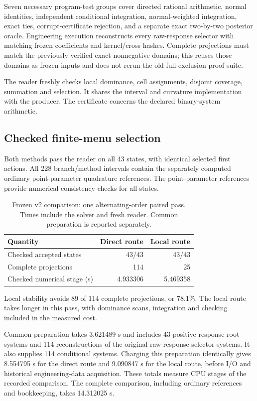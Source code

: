 Seven necessary program-test groups cover directed rational arithmetic, normal identities, independent conditional integration, normal-weighted integration, exact ties, corrupt-certificate rejection, and a separate exact two-by-two posterior oracle. Engineering execution reconstructs every raw-response selector with matching frozen coefficients and kernel/cross hashes. Complete projections must match the previously verified exact nonnegative domains; this reuses those domains as frozen inputs and does not rerun the old full exclusion-proof suite.

The reader freshly checks local dominance, cell assignments, disjoint coverage, summation and selection. It shares the interval and curvature implementation with the producer. The certificate concerns the declared binary-system arithmetic.

\subsection{Checked finite-menu selection}

Both methods pass the reader on all 43 states, with identical selected first actions. All 228 branch/method intervals contain the separately computed ordinary point-parameter quadrature references. The point-parameter references provide numerical consistency checks for all states.

\begin{table}[htbp]\centering\small
\caption{Frozen v2 comparison: one alternating-order paired pass. Times include the solver and fresh reader. Common preparation is reported separately.}\label{tab:positive_summary}
\begin{tabular}{lrr}\toprule
Quantity & Direct route & Local route\\\midrule
Checked accepted states & 43/43 & 43/43\\
Complete projections & 114 & 25\\
Checked numerical stage (s) & 4.933306 & 5.469358\\
\bottomrule\end{tabular}\end{table}

Local stability avoids 89 of 114 complete projections, or 78.1\%. The local route takes longer in this pass, with dominance scans, integration and checking included in the measured cost.

Common preparation takes 3.621489 s and includes 43 positive-response root systems and 114 reconstructions of the original raw-response selector systems. It also supplies 114 conditional systems. Charging this preparation identically gives 8.554795 s for the direct route and 9.090847 s for the local route, before I/O and historical engineering-data acquisition. These totals measure CPU stages of the recorded comparison. The complete comparison, including ordinary references and bookkeeping, takes 14.312025 s.

